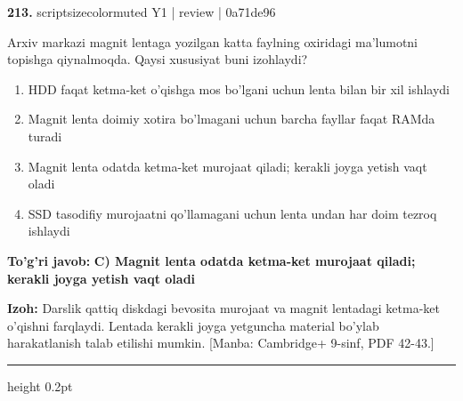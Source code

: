 \documentclass[10pt,a4paper]{article}
\begin{document}
{\bfseries\sffamily\color{ink} 213.} {scriptsizecolor{muted} Y1 | review | 0a71de96}
\par
Arxiv markazi magnit lentaga yozilgan katta faylning oxiridagi ma'lumotni topishga qiynalmoqda. Qaysi xususiyat buni izohlaydi?
\begin{enumerate}[label=\Alph*),leftmargin=9mm]
\item HDD faqat ketma-ket o'qishga mos bo'lgani uchun lenta bilan bir xil ishlaydi
\item Magnit lenta doimiy xotira bo'lmagani uchun barcha fayllar faqat RAMda turadi
\item Magnit lenta odatda ketma-ket murojaat qiladi; kerakli joyga yetish vaqt oladi
\item SSD tasodifiy murojaatni qo'llamagani uchun lenta undan har doim tezroq ishlaydi
\end{enumerate}
\begin{tcolorbox}[enhanced,breakable,colback=teal!4,colframe=teal!60!black,boxrule=0.45pt,arc=1.2mm,left=2.7mm,right=2.7mm,top=1.8mm,bottom=1.8mm,before skip=2mm,after skip=2mm]
{\bfseries\sffamily\color{teal}To'g'ri javob:} \textbf{C) Magnit lenta odatda ketma-ket murojaat qiladi; kerakli joyga yetish vaqt oladi}
\par\smallskip
{\bfseries Izoh:} Darslik qattiq diskdagi bevosita murojaat va magnit lentadagi ketma-ket o'qishni farqlaydi. Lentada kerakli joyga yetguncha material bo'ylab harakatlanish talab etilishi mumkin. [Manba: Cambridge+ 9-sinf, PDF 42-43.]
\end{tcolorbox}
\vspace{2mm}\hrule height 0.2pt\vspace{3mm}
\end{document}
